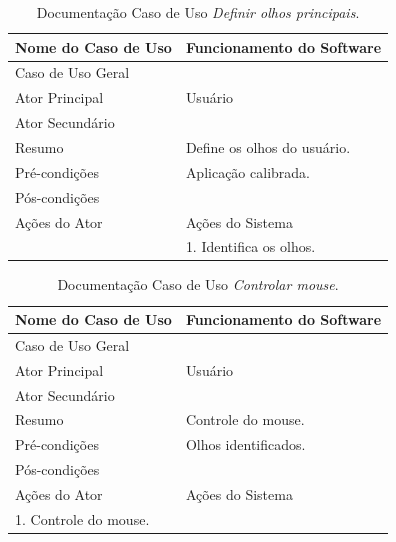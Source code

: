 \begin{longtable}{|l|l|}
\caption{Documentação Caso de Uso \textit{Definir olhos principais}.} \label{tab:dcu-1} \\
\hline 
\multicolumn{1}{|c|}{\textbf{Nome do Caso de Uso}} & 
\multicolumn{1}{c|}{\textbf{Funcionamento do Software}} \\ \hline 
\endfirsthead
\hline
Caso de Uso Geral &  \\ \hline
Ator Principal & Usuário\\ \hline
Ator Secundário & \\ \hline
Resumo & Define os olhos do usuário. \\ \hline 
Pré-condições &  Aplicação calibrada. \\ \hline 
Pós-condições &  \\ \hline
 Ações do Ator& Ações do Sistema \\ \hline
 & 1. Identifica os olhos. \\ \hline
\end{longtable}

\begin{longtable}{|l|l|}
\caption{Documentação Caso de Uso \textit{Controlar mouse}.} \label{tab:dcu-1} \\
\hline 
\multicolumn{1}{|c|}{\textbf{Nome do Caso de Uso}} & 
\multicolumn{1}{c|}{\textbf{Funcionamento do Software}} \\ \hline 
\endfirsthead
\hline
Caso de Uso Geral &  \\ \hline
Ator Principal & Usuário\\ \hline
Ator Secundário & \\ \hline
Resumo & Controle do mouse. \\ \hline 
Pré-condições &  Olhos identificados. \\ \hline 
Pós-condições &  \\ \hline
Ações do Ator& Ações do Sistema \\ \hline
 1. Controle do mouse. &  \\ \hline
\end{longtable}


